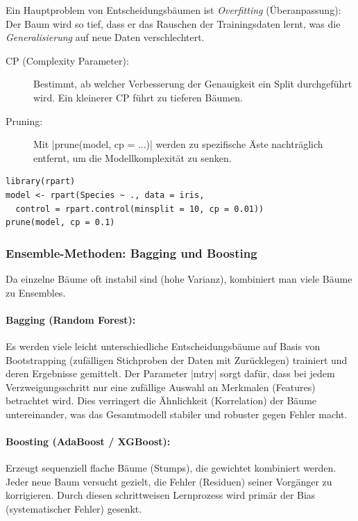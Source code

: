 \documentclass[10pt,twocolumn]{scrartcl}
\renewcommand{\lstinline}{\mycoloredinline}
\begin{document}
Ein Hauptproblem von Entscheidungsbäumen ist \emph{Overfitting} (Überanpassung): Der Baum wird so tief, dass er das Rauschen der Trainingsdaten lernt, was die \emph{Generalisierung} auf neue Daten verschlechtert.
\begin{description}
\item[CP (Complexity Parameter):] Bestimmt, ab welcher Verbesserung der Genauigkeit ein Split durchgeführt wird. Ein kleinerer CP führt zu tieferen Bäumen.
\item[Pruning:] Mit \lstinline|prune(model, cp = ...)| werden zu spezifische Äste nachträglich entfernt, um die Modellkomplexität zu senken.
\end{description}

\begin{lstlisting}
library(rpart)
model <- rpart(Species ~ ., data = iris, 
  control = rpart.control(minsplit = 10, cp = 0.01))
prune(model, cp = 0.1)
\end{lstlisting}


\subsubsection{Ensemble-Methoden: Bagging und Boosting}

Da einzelne Bäume oft instabil sind (hohe Varianz), kombiniert man viele Bäume zu Ensembles.

\paragraph{Bagging (Random Forest):} Es werden viele leicht unterschiedliche Entscheidungsbäume auf Basis von Bootstrapping (zufälligen Stichproben der Daten mit Zurücklegen) trainiert und deren Ergebnisse gemittelt. Der Parameter \lstinline|mtry| sorgt dafür, dass bei jedem Verzweigungsschritt nur eine zufällige Auswahl an Merkmalen (Features) betrachtet wird. Dies verringert die Ähnlichkeit (Korrelation) der Bäume untereinander, was das Gesamtmodell stabiler und robuster gegen Fehler macht.

\paragraph{Boosting (AdaBoost / XGBoost):} Erzeugt sequenziell flache Bäume (Stumps), die gewichtet kombiniert werden. Jeder neue Baum versucht gezielt, die Fehler (Residuen) seiner Vorgänger zu korrigieren. Durch diesen schrittweisen Lernprozess wird primär der Bias (systematischer Fehler) gesenkt.
\end{document}
